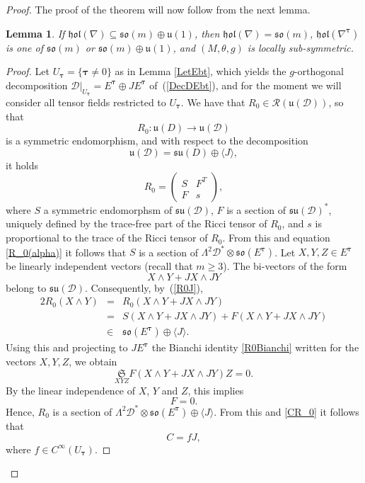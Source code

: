 \documentclass{amsart}
\theoremstyle{plain}
\newtheorem{lem}[theorem]{Lemma}
\theoremstyle{definition}
\def\R{\mathcal{R}}
\def\so{\mathfrak{so}}
\def\su{\mathfrak{su}}
\def\u{\mathfrak{u}}
\newcommand{\hol}{\mathfrak{hol}}
\newcommand{\bt}{{\boldsymbol{\tau}}}
\newcommand{\Su}{\mathfrak{S}}
\newcommand{\1}{\mathbf{1}}
\newcommand{\D}{{\mathcal D}}
\newcommand{\E}{{E}}
\newcommand{\+}{\oplus}
\begin{document}
\begin{proof}
  The proof of the theorem will now follow from the next lemma.


\begin{lem}
\label{mainlemma} If $\hol(\nabla)\subseteq\so(m)\oplus\u(1)$, then $\hol(\nabla)=\so(m)$, 
	$\hol(\nabla^\bt)$ is one of $\so(m)$ or $\so(m)\oplus\u(1)$, and $(M,\theta,g)$ is locally sub-symmetric.
\end{lem}

\begin{proof}
Let $U_\bt=\{\bt\not=0\}$ as in  Lemma \ref{LetEbt}, which yields the $g$-orthogonal decomposition $\D|_{U_{\bt}}=\E^\bt\+J\E^\bt$ of~(\ref{DecDEbt}), and for the moment we will consider all tensor fields restricted to $U_\bt$.
We have that 
$R_0\in\R(\u(\D))$, so that 
$$R_0:\u(D)\to\u(\D)$$ is a symmetric endomorphism, and with respect to the decomposition
$$\u(\D)=\su(D)\oplus\langle J\rangle,$$
it holds 
\begin{equation}\label{R0Matr}
R_0=\left( \begin{matrix} S& F^T\\F&s\end{matrix}\right),\end{equation}
where $S$ a symmetric endomorphsm of $\su(\D)$, $F$  is a  section of $\su(\D)^*$, uniquely defined by the trace-free part of the Ricci tensor of $R_0$, and $s$ is proportional to the trace of the Ricci tensor of $R_0$.
From this and  equation \eqref{R_0(alpha)} 
 it follows that $S$ is a section of $\Lambda^2\D^*\otimes \so(E^\bt)$. 
Let $X,Y,Z\in E^\bt$ be linearly independent vectors (recall that $m\geq 3$).
The bi-vectors of the form
$$X\wedge Y+JX\wedge JY$$
belong to $\su (\D)$.
Consequently, by~(\ref{R0J}), 
\begin{eqnarray*}
2R_0(X\wedge Y)&= & R_0(X\wedge Y+JX\wedge JY)\\
&=&S(X\wedge Y+JX\wedge JY)+F(X\wedge Y+JX\wedge JY)
\\
&\in& \so(E^\bt)\oplus\langle J\rangle.
\end{eqnarray*}
Using this and projecting to $JE^\bt$  the Bianchi identity \eqref{R0Bianchi} written for the vectors $X,Y,Z$, we obtain 
$$\underset{X Y Z}{\Su}F(X\wedge Y+JX\wedge JY)Z=0.$$ By the linear independence of $X$, $Y$ and $Z$, this implies
$$F=0.$$
Hence, $R_0$ is a section of  $\Lambda^2\D^*\otimes \so(E^\bt)\oplus\langle J\rangle$. From this and \eqref{CR_0} it follows that $$C=fJ,$$ where $f\in C^\infty(U_\bt)$.









\end{proof}
\end{proof}
\end{document}
